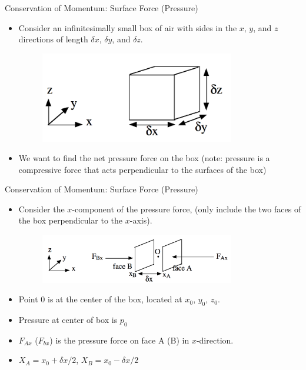 \begin{frame}{Conservation of Momentum: Surface Force (Pressure)}
\begin{itemize}
	\item Consider an infinitesimally small box of air with sides in the $x$, $y$, and $z$ directions of length $\delta x$, $\delta y$, and $\delta z$.
	\begin{figure}
		\includegraphics[width=0.8\textwidth]{pressure1.png}	
	\end{figure}
	\item We want to find the net pressure force on the box (note: pressure is a compressive force that acts perpendicular to the surfaces of the box)
\end{itemize}
\end{frame}
\begin{frame}{Conservation of Momentum: Surface Force (Pressure)}
\begin{itemize}
	\item Consider the $x$-component of the pressure force, (only include the two faces of the box perpendicular to the $x$-axis).
	\begin{figure}
		\includegraphics[width=0.8\textwidth]{pressure2.png}	
	\end{figure}
	\item Point 0 is at the center of the box, located at $x_0$, $y_0$, $z_0$.
	\item Pressure at center of box is $p_0$
	\item $F_{Ax}$ ($F_{bx}$) is the pressure force on face A (B) in $x$-direction.
	\item $X_A = x_0 + \delta x/2$, $X_B = x_0 - \delta x/2$
\end{itemize}
\end{frame}
